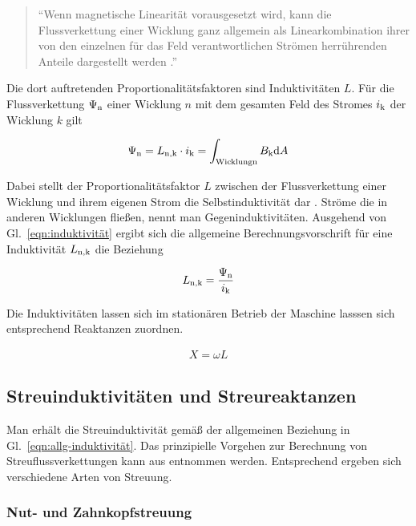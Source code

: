 \begin{quote}
\enquote{Wenn magnetische Linearität vorausgesetzt wird, kann die Flussverkettung einer Wicklung ganz allgemein als Linearkombination ihrer von den einzelnen für das Feld verantwortlichen Strömen herrührenden Anteile dargestellt werden \autocite[S.~511]{mullerII2008}.} 
\end{quote}

Die dort auftretenden Proportionalitätsfaktoren sind Induktivitäten $L$.
Für die Flussverkettung $\Psi_{\mathrm{n}}$ einer Wicklung $n$ mit dem gesamten Feld des Stromes $i_{\mathrm{k}}$ der Wicklung $k$ gilt

\begin{align}
\Psi_{\mathrm{n}} = L_{\mathrm{n,k}}\cdot i_{\mathrm{k}} = \int_{\mathrm{Wicklung n}}B_{\mathrm{k}}\mathrm{d}A \label{eqn:induktivität}
\end{align}

Dabei stellt der Proportionalitätsfaktor $L$ zwischen der Flussverkettung einer Wicklung und ihrem eigenen Strom die Selbstinduktivität dar \autocite[S.~24]{ternes2013}.
Ströme die in anderen Wicklungen fließen, nennt man Gegeninduktivitäten.
Ausgehend von Gl.~\ref{eqn:induktivität} ergibt sich die allgemeine Berechnungsvorschrift für eine Induktivität $L_{\mathrm{n,k}}$ die Beziehung

\begin{align}
L_{\mathrm{n,k}} = \frac{\Psi_{\mathrm{n}}}{i_{\mathrm{k}}} \label{eqn:allg-induktivität}
\end{align}

Die Induktivitäten lassen sich im stationären Betrieb der Maschine lasssen sich entsprechend Reaktanzen zuordnen.

\begin{align}
X = \omega L
\end{align}

\subsection{Streuinduktivitäten und Streureaktanzen}\label{sec:induktiv-streu}

Man erhält die Streuinduktivität gemäß der allgemeinen Beziehung in Gl.~\ref{eqn:allg-induktivität}.
Das prinzipielle Vorgehen zur Berechnung von Streuflussverkettungen kann aus \textcite[S.~311]{mullerII2008} entnommen werden.
Entsprechend ergeben sich verschiedene Arten von Streuung.

\subsubsection{Nut- und Zahnkopfstreuung}\label{sec:nut-zahn-streuung}


